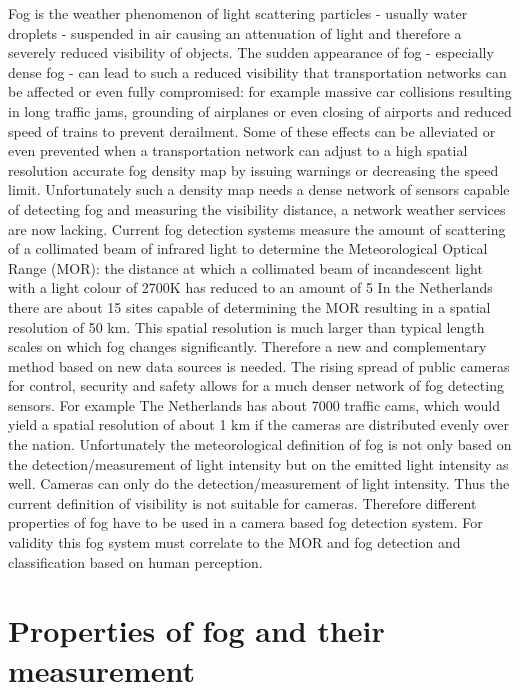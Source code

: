\documentclass{article}
\begin{document}
Fog is the weather phenomenon of light scattering particles - usually water droplets - suspended in air causing an attenuation of light and therefore a severely reduced visibility of objects. The sudden appearance of fog - especially dense fog - can lead to such a reduced visibility that transportation networks can be affected or even fully compromised: for example massive car collisions resulting in long traffic jams, grounding of airplanes or even closing of airports and reduced speed of trains to prevent derailment. Some of these effects can be alleviated or even prevented when a transportation network can adjust to a high spatial resolution accurate fog density map by issuing warnings or decreasing the speed limit. Unfortunately such a density map needs a dense network of sensors capable of detecting fog and measuring the visibility distance, a network weather services are now lacking. Current fog detection systems measure the amount of scattering of a collimated beam of infrared light to determine the Meteorological Optical Range  (MOR): the distance at which a collimated beam of incandescent light with a light colour of 2700K has reduced to an amount of 5%
In the Netherlands there are about 15 sites capable of determining the MOR resulting in a spatial resolution of 50 km. This spatial resolution is much larger than typical length scales on which fog changes significantly. Therefore a new and complementary method based on new data sources is needed. The rising spread of public cameras for control, security and safety allows for a much denser network of fog detecting sensors. For example The Netherlands has about 7000 traffic cams, which would yield a spatial resolution of about 1 km if the cameras are distributed evenly over the nation. Unfortunately the meteorological definition of fog is not only based on the detection/measurement of light intensity but on the emitted light intensity as well. Cameras can only do the detection/measurement of light intensity. Thus the current definition of visibility is not suitable for cameras. Therefore different properties of fog have to be used in a camera based fog detection system. For validity this fog system must correlate to the MOR and fog detection and classification based on human perception. 

\section{Properties of fog and their measurement}
\end{document}
